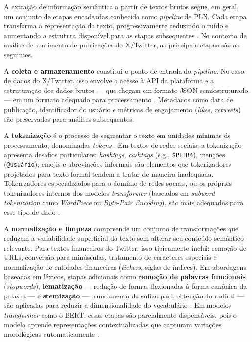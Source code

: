 A extração de informação semântica a partir de textos brutos segue, em geral, um conjunto de etapas encadeadas conhecido como \textit{pipeline} de PLN. Cada etapa transforma a representação do texto, progressivamente reduzindo o ruído e aumentando a estrutura disponível para as etapas subsequentes \cite{jurafsky2026,caseli2024cap1}. No contexto de análise de sentimento de publicações do X/Twitter, as principais etapas são as seguintes.

A \textbf{coleta e armazenamento} constitui o ponto de entrada do \textit{pipeline}. No caso de dados do X/Twitter, isso envolve o acesso à API da plataforma e a estruturação dos dados brutos --- que chegam em formato JSON semiestruturado --- em um formato adequado para processamento \cite{freitas2024cap13}. Metadados como data de publicação, identificador do usuário e métricas de engajamento (\textit{likes}, \textit{retweets}) são preservados para análises subsequentes.

A \textbf{tokenização} é o processo de segmentar o texto em unidades mínimas de processamento, denominadas \textit{tokens} \cite{jurafsky2026}. Em textos de redes sociais, a tokenização apresenta desafios particulares: \textit{hashtags}, \textit{cashtags} (e.g., \texttt{\$PETR4}), menções (\texttt{@usuário}), emojis e abreviações informais são elementos que tokenizadores projetados para texto formal tendem a tratar de maneira inadequada. Tokenizadores especializados para o domínio de redes sociais, ou os próprios tokenizadores internos dos modelos \textit{transformer} (baseados em \textit{subword tokenization} como \textit{WordPiece} ou \textit{Byte-Pair Encoding}), são mais adequados para esse tipo de dado \cite{jurafsky2026,santos2023finbert}.

A \textbf{normalização e limpeza} compreende um conjunto de transformações que reduzem a variabilidade superficial do texto sem alterar seu conteúdo semântico relevante. Para textos financeiros do Twitter, isso tipicamente inclui: remoção de URLs, conversão para minúsculas, tratamento de caracteres especiais e normalização de entidades financeiras (\textit{tickers}, siglas de índices). Em abordagens baseadas em léxicos, etapas adicionais como \textbf{remoção de palavras funcionais} (\textit{stopwords}), \textbf{lematização} --- redução de formas flexionadas à forma canônica da palavra --- e \textbf{stemização} --- truncamento do sufixo para obtenção do radical --- são aplicadas para reduzir a dimensionalidade do vocabulário \cite{caseli2024cap1,sousa2025}. Em modelos \textit{transformer} como o BERT, essas etapas são parcialmente dispensáveis, pois o modelo aprende representações contextualizadas que capturam variações morfológicas automaticamente \cite{jurafsky2026}.

